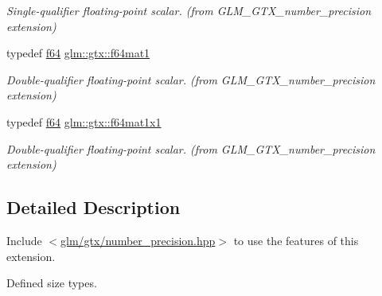 \begin{DoxyCompactItemize}
\begin{DoxyCompactList}\small\item\em Single-\/qualifier floating-\/point scalar. (from G\+L\+M\+\_\+\+G\+T\+X\+\_\+number\+\_\+precision extension) \end{DoxyCompactList}\item 
\mbox{\label{group__gtx__number__precision_ga23f8f53c78b50aa07a113c3d07d01bc9}} 
typedef \hyperlink{group__gtc__type__precision_ga2bba392e555124b36cde6abba349bab3}{f64} \hyperlink{group__gtx__number__precision_ga23f8f53c78b50aa07a113c3d07d01bc9}{glm\+::gtx\+::f64mat1}
\begin{DoxyCompactList}\small\item\em Double-\/qualifier floating-\/point scalar. (from G\+L\+M\+\_\+\+G\+T\+X\+\_\+number\+\_\+precision extension) \end{DoxyCompactList}\item 
\mbox{\label{group__gtx__number__precision_ga710a5952d78b22635c71c5fc2c0a3319}} 
typedef \hyperlink{group__gtc__type__precision_ga2bba392e555124b36cde6abba349bab3}{f64} \hyperlink{group__gtx__number__precision_ga710a5952d78b22635c71c5fc2c0a3319}{glm\+::gtx\+::f64mat1x1}
\begin{DoxyCompactList}\small\item\em Double-\/qualifier floating-\/point scalar. (from G\+L\+M\+\_\+\+G\+T\+X\+\_\+number\+\_\+precision extension) \end{DoxyCompactList}\end{DoxyCompactItemize}


\subsection{Detailed Description}
Include $<$\hyperlink{number__precision_8hpp}{glm/gtx/number\+\_\+precision.\+hpp}$>$ to use the features of this extension.

Defined size types. 